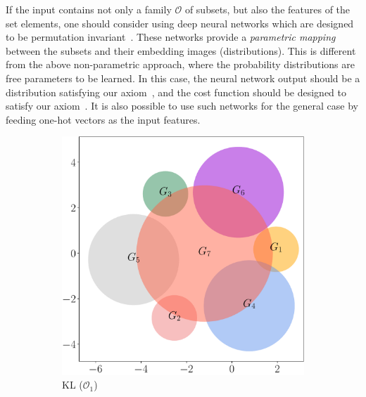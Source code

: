 \documentclass{article}
\begin{document}
If the input contains not only a family $\mathcal{O}$ of subsets, but also
the features of the set elements, one should consider using deep neural networks
which are designed to be permutation invariant~\cite{deepsets,attention}. These
networks provide a \emph{parametric mapping} between the subsets and their
embedding images (distributions). This is different from the above
non-parametric approach, where the probability distributions are free parameters
to be learned. In this case, the neural network output should be a distribution
satisfying our axiom~, and the cost function should be designed to
satisfy our axiom~.
It is also possible to use such networks for the general case by feeding one-hot vectors as the input features.
\begin{figure}[t]
\centering
\begin{subfigure}[b]{.48\textwidth}
\includegraphics[width=\textwidth]{kl1}
\caption{KL ($\mathcal{O}_1$)}
\end{subfigure}
\begin{subfigure}[b]{.48\textwidth}

\end{subfigure}
\end{figure}
\end{document}

